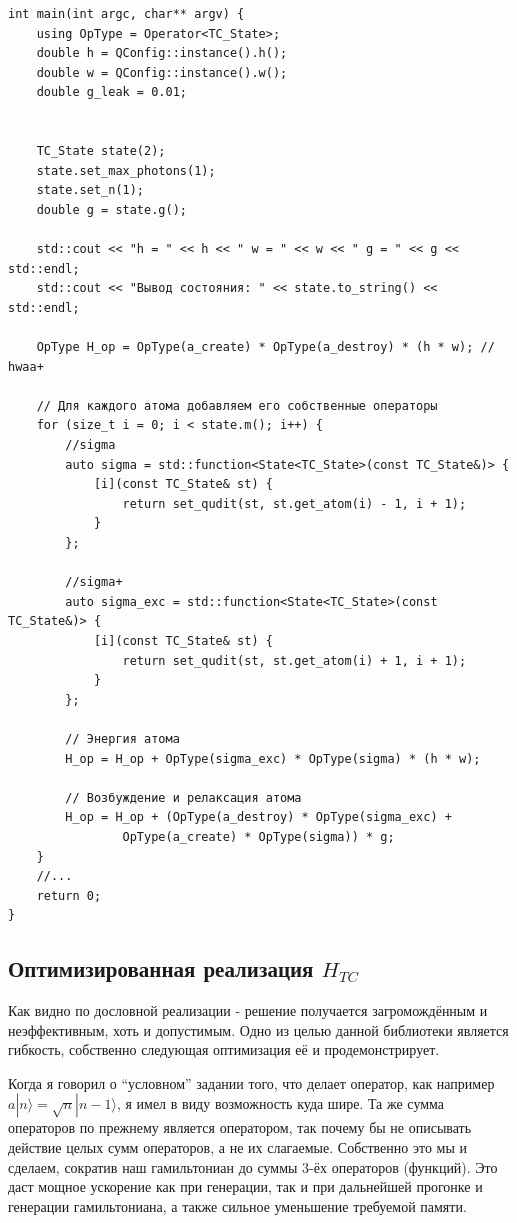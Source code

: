 \documentclass[12pt,fleqn]{article}
\begin{document}
\begin{mdframed}[linecolor=black, topline=true, bottomline=true,
leftline=false, rightline=false]
\begin{verbatim}
int main(int argc, char** argv) {
    using OpType = Operator<TC_State>;
    double h = QConfig::instance().h();
    double w = QConfig::instance().w();
    double g_leak = 0.01;
    

    TC_State state(2);
    state.set_max_photons(1);
    state.set_n(1);
    double g = state.g();

    std::cout << "h = " << h << " w = " << w << " g = " << g << std::endl;
    std::cout << "Вывод состояния: " << state.to_string() << std::endl;
    
    OpType H_op = OpType(a_create) * OpType(a_destroy) * (h * w); // hwaa+

    // Для каждого атома добавляем его собственные операторы
    for (size_t i = 0; i < state.m(); i++) {
        //sigma
        auto sigma = std::function<State<TC_State>(const TC_State&)> {
            [i](const TC_State& st) {
                return set_qudit(st, st.get_atom(i) - 1, i + 1);
            }
        };

        //sigma+
        auto sigma_exc = std::function<State<TC_State>(const TC_State&)> {
            [i](const TC_State& st) {
                return set_qudit(st, st.get_atom(i) + 1, i + 1);
            }
        };

        // Энергия атома
        H_op = H_op + OpType(sigma_exc) * OpType(sigma) * (h * w);

        // Возбуждение и релаксация атома
        H_op = H_op + (OpType(a_destroy) * OpType(sigma_exc) + 
                OpType(a_create) * OpType(sigma)) * g;
    }
    //...
    return 0;
}
\end{verbatim}
\end{mdframed}

        \subsection{Оптимизированная реализация $H_{TC}$}

        Как видно по дословной реализации - решение получается загромождённым и неэффективным, хоть и допустимым. Одно из целью данной библиотеки является гибкость, собственно следующая оптимизация 
        её и продемонстрирует.

        Когда я говорил о ``условном'' задании того, что делает оператор, как например $a|n\rangle = \sqrt{n}|n-1\rangle$, я имел в виду возможность куда шире.
        Та же сумма операторов по прежнему является оператором, так почему бы не описывать действие целых сумм операторов, а не их слагаемые. Собственно это мы и сделаем, сократив наш гамильтониан до 
        суммы 3-ёх операторов (функций). Это даст мощное ускорение как при генерации, так и при дальнейшей прогонке и генерации гамильтониана, а также сильное уменьшение требуемой памяти.
\end{document}
